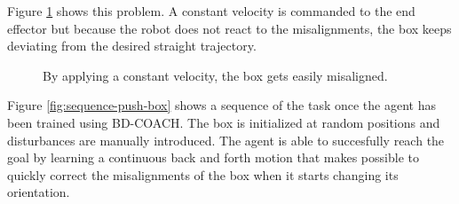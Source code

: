  Figure \ref{fig:planar-motion-problem} shows this problem. A constant velocity is commanded to the end effector but because the robot does not react to the misalignments, the box keeps deviating from the desired straight trajectory.


 \begin{figure}[H]
  \centering
  \hspace*{\fill}%
   \hfill
   \hfill
   \hspace*{\fill}%
  \caption{By applying a constant velocity, the box gets easily misaligned.}
  \label{fig:planar-motion-problem}
\end{figure}

Figure \ref{fig:sequence-push-box} shows a sequence of the task once the agent has been trained using BD-COACH. The box is initialized at random positions and disturbances are manually introduced. The agent is able to succesfully reach the goal by learning a continuous back and forth motion that makes possible to quickly correct the misalignments of the box when it starts changing its orientation.

